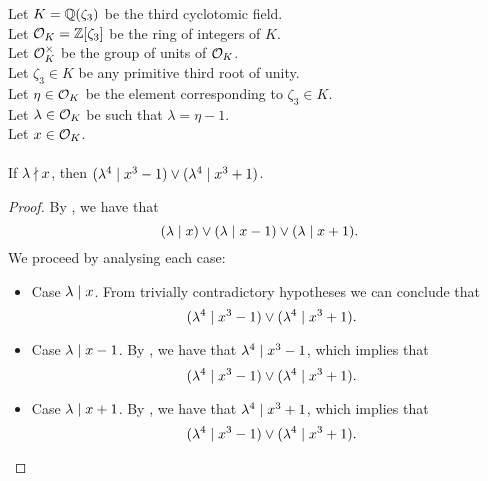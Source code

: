 \begin{lemma}
    \label{lmm:lambda_pow_four_dvd_cube_sub_one_or_add_one_of_lambda_not_dvd}
    \leanok
    Let $K = \mathbb{Q}(\zeta_3)$ be the third cyclotomic field. \\
    Let $\mathcal{O}_K = \mathbb{Z}[\zeta_3]$ be the ring of integers of $K$. \\
    Let $\mathcal{O}^\times_K$ be the group of units of $\mathcal{O}_K$. \\
    Let $\zeta_3 \in K$ be any primitive third root of unity. \\
    Let $\eta \in \mathcal{O}_K$ be the element corresponding to $\zeta_3 \in K$. \\
    Let $\lambda \in \mathcal{O}_K$ be such that $\lambda = \eta -1$. \\
    Let $x \in \mathcal{O}_K$. \\\\
    If $\lambda \nmid x$, then $(\lambda^4 \mid x^3 - 1)
    \lor (\lambda^4 \mid x^3 + 1)$.
\end{lemma}
\begin{proof}
    \leanok
    By , we have that
    $$(\lambda \mid x) \lor (\lambda \mid x-1) \lor (\lambda \mid x+1).$$
    We proceed by analysing each case:
    \begin{itemize}
        \item Case $\lambda \mid x$. From trivially contradictory hypotheses we can conclude that
        $$(\lambda^4 \mid x^3 - 1) \lor (\lambda^4 \mid x^3 + 1).$$
        \item Case $\lambda \mid x-1$. By ,
        we have that $\lambda^ 4 \mid x^3 - 1$, which implies that
        $$(\lambda^4 \mid x^3 - 1) \lor (\lambda^4 \mid x^3 + 1).$$
        \item Case $\lambda \mid x+1$. By ,
        we have that $\lambda^ 4 \mid x^3 + 1$, which implies that
        $$(\lambda^4 \mid x^3 - 1) \lor (\lambda^4 \mid x^3 + 1).$$
    \end{itemize}
\end{proof}